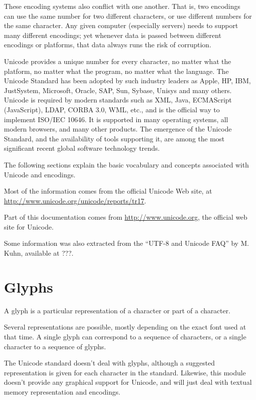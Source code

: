 \documentclass[letterpaper,10pt,english]{sphinxmanual}
\begin{document}
These encoding systems also conflict with one another. That is, two encodings
can use the same number for two different characters, or use different numbers
for the same character. Any given computer (especially servers) needs to
support many different encodings; yet whenever data is passed between different
encodings or platforms, that data always runs the risk of corruption.

Unicode provides a unique number for every character, no matter what the
platform, no matter what the program, no matter what the language. The Unicode
Standard has been adopted by such industry leaders as Apple, HP, IBM,
JustSystem, Microsoft, Oracle, SAP, Sun, Sybase, Unisys and many others.
Unicode is required by modern standards such as XML, Java, ECMAScript
(JavaScript), LDAP, CORBA 3.0, WML, etc., and is the official way to implement
ISO/IEC 10646. It is supported in many operating systems, all modern browsers,
and many other products. The emergence of the Unicode Standard, and the
availability of tools supporting it, are among the most significant recent
global software technology trends.

The following sections explain the basic vocabulary and concepts associated
with Unicode and encodings.

Most of the information comes from the official Unicode Web site, at
\href{http://www.unicode.org/unicode/reports/tr17}{http://www.unicode.org/unicode/reports/tr17}.

Part of this documentation comes from \href{http://www.unicode.org}{http://www.unicode.org}, the official web site for Unicode.

Some information was also extracted from the ``UTF-8 and Unicode FAQ'' by M.
Kuhn, available at ???.


\section{Glyphs}
\label{unicode:glyphs}\label{unicode:id3}
A glyph is a particular representation of a character or part of a character.

Several representations are possible, mostly depending on the exact font used
at that time. A single glyph can correspond to a sequence of characters, or a
single character to a sequence of glyphs.

The Unicode standard doesn't deal with glyphs, although a suggested
representation is given for each character in the standard. Likewise, this
module doesn't provide any graphical support for Unicode, and will just deal
with textual memory representation and encodings.
\end{document}
